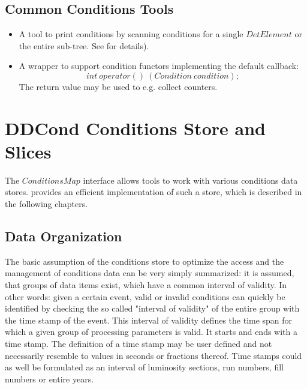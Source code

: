 \documentclass[10pt,a4paper]{article}
\begin{document}
\subsection{Common Conditions Tools}
\label{subsec:ddcond-conditions-tools}

\noindent
\begin{itemize}
\item {} A tool to print conditions by scanning conditions for a 
        single $DetElement$ or the entire sub-tree. See 
        for details).
\item {} A wrapper to support condition functors implementing 
        the default callback:
        $$
        int\ operator()\ (Condition\ condition);
        $$
        The return value may be used to e.g. collect counters.
\end{itemize}

\newpage
\section{DDCond Conditions Store and Slices}
\label{subsec:ddcond-conditions-store}

\noindent
The $ConditionsMap$ interface allows tools to work with various conditions 
data stores. \DDC provides an efficient implementation of such a store,
which is described in the following chapters.

\subsection{Data Organization}
\label{subsec:ddcond-internal-data-organization}

\noindent
The basic assumption of the \DDC conditions store to optimize the access 
and the management of conditions
data can be very simply summarized: it is assumed, that groups of data items
exist, which have a common interval of validity. In other words: given a 
certain event, valid or invalid conditions can quickly be identified by 
checking the so called "interval of validity" of the entire group with the
time stamp of the event. This interval of validity defines the time span
for which a given group of processing parameters is valid. It starts and 
ends with a time stamp. The definition of a time stamp may be user defined 
and not necessarily resemble to values in seconds or fractions thereof. 
Time stamps could as well be formulated as an interval of luminosity sections,
run numbers, fill numbers or entire years. 
\end{document}
